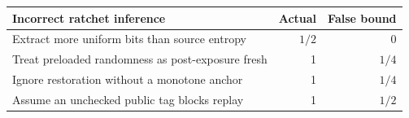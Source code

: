\begin{tabular}{p{9.5cm}rr}
\toprule
Incorrect ratchet inference & Actual & False bound \\
\midrule
Extract more uniform bits than source entropy & $1/2$ & 0 \\
Treat preloaded randomness as post-exposure fresh & 1 & $1/4$ \\
Ignore restoration without a monotone anchor & 1 & $1/4$ \\
Assume an unchecked public tag blocks replay & 1 & $1/2$ \\
\bottomrule
\end{tabular}
